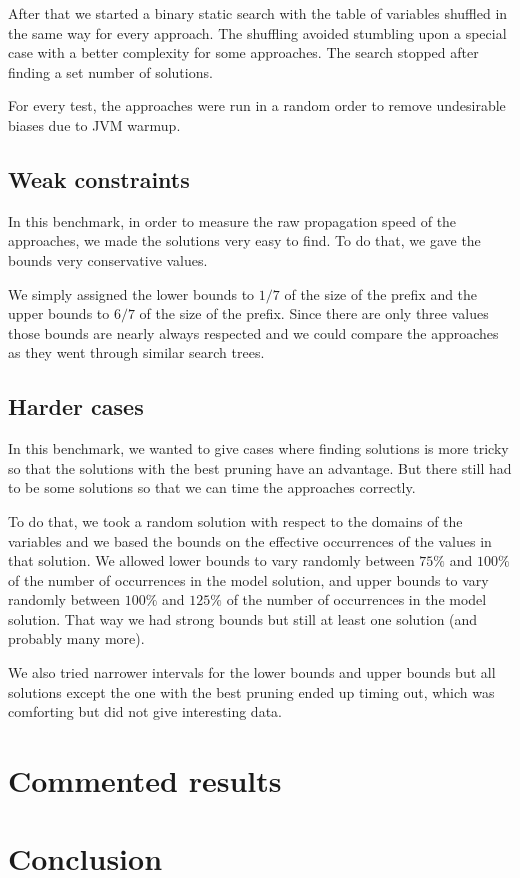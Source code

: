 \documentclass[a4paper,10pt]{article}
\begin{document}
After that we started a binary static search with the table of variables shuffled in the same way for every approach. The shuffling avoided stumbling upon a special case with a better complexity for some approaches. The search stopped after finding a set number of solutions.

For every test, the approaches were run in a random order to remove undesirable biases due to JVM warmup.

\subsection{Weak constraints}
\label{subsec:tests-weak}

In this benchmark, in order to measure the raw propagation speed of the approaches, we made the solutions very easy to find. To do that, we gave the bounds very conservative values.

We simply assigned the lower bounds to $1/7$ of the size of the prefix and the upper bounds to $6/7$ of the size of the prefix. Since there are only three values those bounds are nearly always respected and we could compare the approaches as they went through similar search trees.

\subsection{Harder cases}
\label{subsec:tests-hard}

In this benchmark, we wanted to give cases where finding solutions is more tricky so that the solutions with the best pruning have an advantage. But there still had to be some solutions so that we can time the approaches correctly.

To do that, we took a random solution with respect to the domains of the variables and we based the bounds on the effective occurrences of the values in that solution. We allowed lower bounds to vary randomly between $75\%$ and $100\%$ of the number of occurrences in the model solution, and upper bounds to vary randomly between $100\%$ and $125\%$ of the number of occurrences in the model solution. That way we had strong bounds but still at least one solution (and probably many more).

We also tried narrower intervals for the lower bounds and upper bounds but all solutions except the one with the best pruning ended up timing out, which was comforting but did not give interesting data.

\section{Commented results}



\section{Conclusion}
\end{document}
